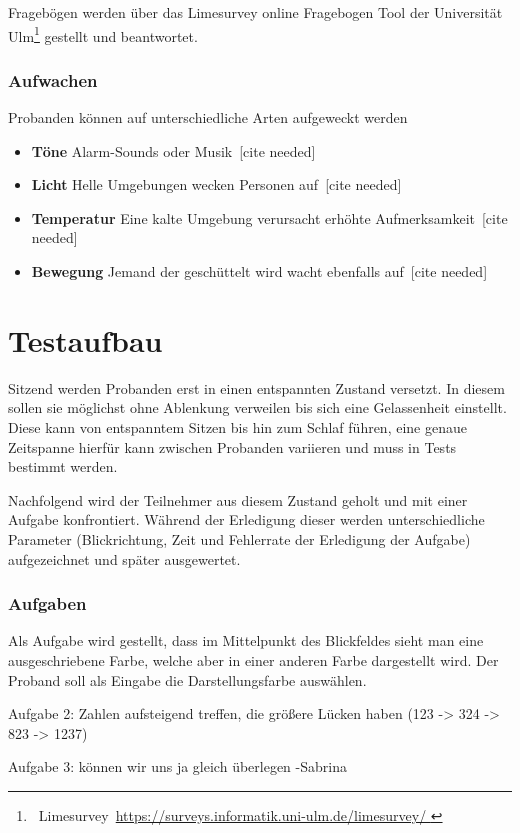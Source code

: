 \documentclass[a4paper, 11pt]{article}
\begin{document}
Fragebögen werden über das Limesurvey online Fragebogen Tool der Universität Ulm\footnote{~Limesurvey~\url{https://surveys.informatik.uni-ulm.de/limesurvey/
}} gestellt und beantwortet. 

\subsubsection*{Aufwachen}
Probanden können auf unterschiedliche Arten aufgeweckt werden
\begin{itemize}
    \item \textbf{Töne} Alarm-Sounds oder Musik~[cite needed]
    \item \textbf{Licht} Helle Umgebungen wecken Personen auf~[cite needed]
    \item \textbf{Temperatur} Eine kalte Umgebung verursacht erhöhte Aufmerksamkeit~[cite needed]
    \item \textbf{Bewegung} Jemand der geschüttelt wird wacht ebenfalls auf~[cite needed]
\end{itemize}

\section*{Testaufbau}
Sitzend werden Probanden erst in einen entspannten Zustand versetzt. In diesem sollen sie möglichst ohne Ablenkung verweilen bis sich eine Gelassenheit einstellt. Diese kann von entspanntem Sitzen bis hin zum Schlaf führen, eine genaue Zeitspanne hierfür kann zwischen Probanden variieren und muss in Tests bestimmt werden.

Nachfolgend wird der Teilnehmer aus diesem Zustand geholt und mit einer Aufgabe konfrontiert. Während der Erledigung dieser werden unterschiedliche Parameter (Blickrichtung, Zeit und Fehlerrate der Erledigung der Aufgabe) aufgezeichnet und später ausgewertet.


\subsubsection*{Aufgaben}
Als Aufgabe wird gestellt, dass im Mittelpunkt des Blickfeldes sieht man eine ausgeschriebene Farbe, welche aber in einer anderen Farbe dargestellt wird. Der Proband soll als Eingabe die Darstellungsfarbe auswählen.

Aufgabe 2: Zahlen aufsteigend treffen, die größere Lücken haben (123 -> 324 -> 823 -> 1237)

Aufgabe 3: können wir uns ja gleich überlegen -Sabrina
\end{document}
